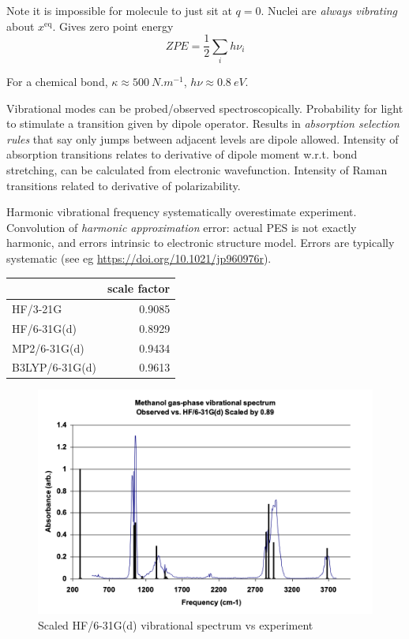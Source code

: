 \documentclass[11pt]{article}
\begin{document}
Note it is impossible for molecule to just sit at \(q = 0\).  Nuclei are \emph{always vibrating} about \(x^\text{eq}\). Gives zero point energy
\[ZPE = \frac{1}{2}\sum_i h\nu_i\]

For a chemical bond, \(\kappa\approx \SI{500}{N.m^{-1}}\), \(h\nu \approx \SI{0.8}{eV}\).

Vibrational modes can be probed/observed spectroscopically.  Probability for light to stimulate a transition given by dipole operator.  Results in \emph{absorption selection rules} that say only jumps between adjacent levels are dipole allowed.  Intensity of absorption transitions relates to derivative of dipole moment w.r.t. bond stretching, can be calculated from electronic wavefunction.  Intensity of Raman transitions related to derivative of polarizability.

Harmonic vibrational frequency systematically overestimate experiment. Convolution of \emph{harmonic approximation} error: actual PES is not exactly harmonic, and errors intrinsic to electronic structure model.  Errors are typically systematic (see eg \url{https://doi.org/10.1021/jp960976r}).

\begin{center}
\begin{tabular}{lr}
 & scale factor\\
\hline
HF/3-21G & 0.9085\\
HF/6-31G(d) & 0.8929\\
MP2/6-31G(d) & 0.9434\\
B3LYP/6-31G(d) & 0.9613\\
\end{tabular}
\end{center}

\begin{figure}[htbp]
\centering
\includegraphics[width=.9\linewidth]{./Images/Methanol.png}
\caption{Scaled HF/6-31G(d) vibrational spectrum vs experiment}
\end{figure}
\end{document}
